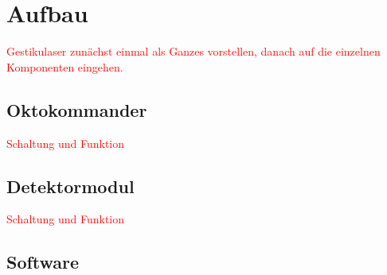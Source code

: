 \chapter{Aufbau}
\label{ch:Funktionsweise und Aufbau}

\textcolor{red}{Gestikulaser zunächst einmal als Ganzes vorstellen, danach auf die einzelnen Komponenten eingehen.}


\section{Oktokommander}
\label{sec:Oktokommander}

\textcolor{red}{Schaltung und Funktion}


\section{Detektormodul}
\label{sec:Detektormodul}

\textcolor{red}{Schaltung und Funktion}


\section{Software}
\label{sec:Software}